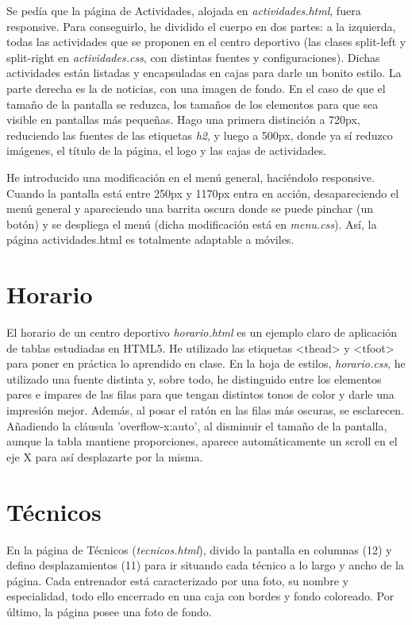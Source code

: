 Se pedía que la página de Actividades, alojada en \textit{actividades.html}, fuera responsive. Para conseguirlo, he dividido el cuerpo en dos partes: a la izquierda, todas las actividades que se proponen en el centro deportivo (las clases split-left y split-right en \textit{actividades.css}, con distintas fuentes y configuraciones). Dichas actividades están listadas y encapsuladas en cajas para darle un bonito estilo. La parte derecha es la de noticias, con una imagen de fondo. En el caso de que el tamaño de la pantalla se reduzca, los tamaños de los elementos para que sea visible en pantallas más pequeñas. Hago una primera distinción a 720px, reduciendo las fuentes de las etiquetas \textit{h2}, y luego a 500px, donde ya sí reduzco imágenes, el título de la página, el logo y las cajas de actividades.

He introducido una modificación en el menú general, haciéndolo responsive. Cuando la pantalla está entre 250px y 1170px entra en acción, desapareciendo el menú general y apareciendo una barrita oscura donde se puede pinchar (un botón) y se despliega el menú (dicha modificación está en \textit{menu.css}). Así, la página actividades.html es totalmente adaptable a móviles.

\section{Horario}

El horario de un centro deportivo \textit{horario.html} es un ejemplo claro de aplicación de tablas estudiadas en HTML5. He utilizado las etiquetas <thead> y <tfoot> para poner en práctica lo aprendido en clase. En la hoja de estilos, \textit{horario.css}, he utilizado una fuente distinta y, sobre todo, he distinguido entre los elementos  pares e impares de las filas para que tengan distintos tonos de color y darle una impresión mejor. Además, al posar el ratón en las filas más oscuras, se esclarecen. Añadiendo la cláusula 'overflow-x:auto', al disminuir el tamaño de la pantalla, aunque la tabla mantiene proporciones, aparece automáticamente un scroll en el eje X para así desplazarte por la misma.

\section{Técnicos}

En la página de Técnicos (\textit{tecnicos.html}), divido la pantalla en columnas (12) y defino desplazamientos (11) para ir situando cada técnico a lo largo y ancho de la página. Cada entrenador está caracterizado por una foto, su nombre y especialidad, todo ello encerrado en una caja con bordes y fondo coloreado. Por último, la página posee una foto de fondo.

